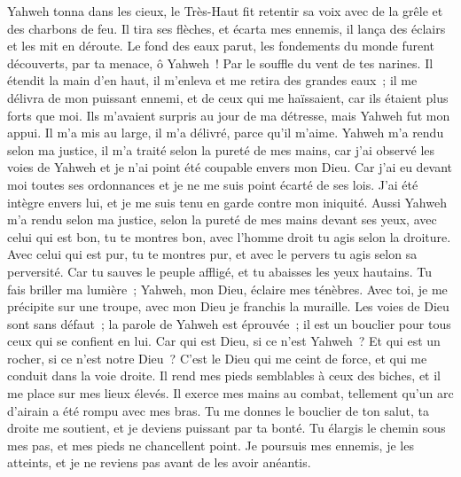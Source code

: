 \begin{multicols}{2}
Yahweh tonna dans les cieux, le Très-Haut fit retentir sa voix avec de la grêle et des charbons de feu.
Il tira ses flèches, et écarta mes ennemis, il lança des éclairs et les mit en déroute.
Le fond des eaux parut, les fondements du monde furent découverts, par ta menace, ô Yahweh~! Par le souffle du vent de tes narines.
Il étendit la main d'en haut, il m'enleva et me retira des grandes eaux~;
il me délivra de mon puissant ennemi, et de ceux qui me haïssaient, car ils étaient plus forts que moi.
Ils m'avaient surpris au jour de ma détresse, mais Yahweh fut mon appui.
Il m'a mis au large, il m'a délivré, parce qu'il m'aime.
Yahweh m'a rendu selon ma justice, il m'a traité selon la pureté de mes mains,
car j'ai observé les voies de Yahweh et je n'ai point été coupable envers mon Dieu.
Car j'ai eu devant moi toutes ses ordonnances et je ne me suis point écarté de ses lois.
J'ai été intègre envers lui, et je me suis tenu en garde contre mon iniquité.
Aussi Yahweh m'a rendu selon ma justice, selon la pureté de mes mains devant ses yeux,
avec celui qui est bon, tu te montres bon, avec l'homme droit tu agis selon la droiture.
Avec celui qui est pur, tu te montres pur, et avec le pervers tu agis selon sa perversité.
Car tu sauves le peuple affligé, et tu abaisses les yeux hautains.
Tu fais briller ma lumière~; Yahweh, mon Dieu, éclaire mes ténèbres.
Avec toi, je me précipite sur une troupe, avec mon Dieu je franchis la muraille.
Les voies de Dieu sont sans défaut~; la parole de Yahweh est éprouvée~; il est un bouclier pour tous ceux qui se confient en lui.
Car qui est Dieu, si ce n'est Yahweh~? Et qui est un rocher, si ce n'est notre Dieu~?
C'est le Dieu qui me ceint de force, et qui me conduit dans la voie droite.
Il rend mes pieds semblables à ceux des biches, et il me place sur mes lieux élevés.
Il exerce mes mains au combat, tellement qu'un arc d'airain a été rompu avec mes bras.
Tu me donnes le bouclier de ton salut, ta droite me soutient, et je deviens puissant par ta bonté.
Tu élargis le chemin sous mes pas, et mes pieds ne chancellent point.
Je poursuis mes ennemis, je les atteints, et je ne reviens pas avant de les avoir anéantis.

\end{multicols}
